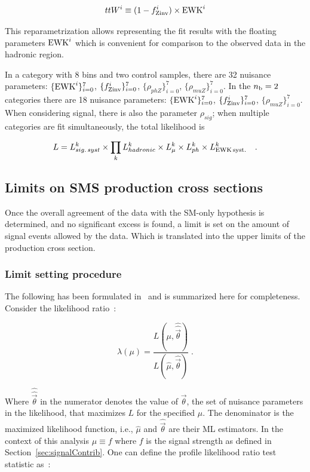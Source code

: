 \begin{equation}
  ttW^{i} \equiv (1-f_{\rm Zinv}^{i})\times \mathrm{EWK}^i
  \label{eq:ttWEwk}
\end{equation}


This reparametrization allows representing the fit results with the floating
parameters $\mathrm{EWK}^{i}$ which is convenient for comparison to the observed data
in the hadronic region. 

In a category with 8 \HT bins and two control samples, there are 
32 nuisance parameters: $\{\mathrm{EWK}^{i}\}_{i=0}^{7}$, $\{f_{\rm Zinv}^{i}\}_{i=0}^{7}$, $\{\rho_{phZ}\}_{i=0}^{7}$,
$\{\rho_{muZ}\}_{i=0}^{7}$. In the $n_{\text{b}} = 2$ categories there are 
18 nuisance parameters: $\{\mathrm{EWK}^{i}\}_{i=0}^{7}$, $\{f_{\rm Zinv}^{i}\}_{i=0}^{7}$, 
$\{\rho_{muZ}\}_{i=0}^{7}$.  When considering signal, 
there is also the parameter $\rho_{sig}$; when multiple categories 
are fit simultaneously, the total likelihood is

\begin{equation}
L = L_{sig.\,syst}^k \times \prod_k L_{hadronic}^k
\times L_{\mu}^k \times L_{ph}^k \times L_{\rm EWK\, syst.}^k \quad .
\end{equation}

\subsection{Limits on SMS production cross sections\label{sec:interpretation}}
Once the overall agreement of the data with the SM-only hypothesis is 
determined, and no significant excess is found, a limit is set on the
amount of signal events allowed by the data. Which is translated into
the upper limits of the production cross section.

\subsubsection{Limit setting procedure\label{sec:cls}}

The following has been formulated in~\cite{LairdThesis} and is summarized 
here for completeness. 
Consider the likelihood ratio~\cite{Cowan:2010js}:

\begin{equation}
\label{eq:PLR}
\lambda(\mu) = \frac{ L(\mu,
\hat{\hat{\vec{\theta}}}) } {L(\hat{\mu}, \hat{\vec{\theta}}) } \;.
\end{equation}

Where $\hat{\hat{\vec{\theta}}}$ in the numerator denotes the
value of $\vec{\theta}$, the set of nuisance parameters in the likelihood,
that maximizes $L$ for the specified $\mu$.
The denominator is the maximized likelihood function, i.e., $\hat{\mu}$
and $\hat{\vec{\theta}}$ are their ML estimators. In the context of this
analysis $\mu \equiv f$ where $f$ is the signal strength as defined 
in Section~\ref{sec:signalContrib}.  One can define the profile
likelihood ratio test statistic as~\cite{Cowan:2010js}:

